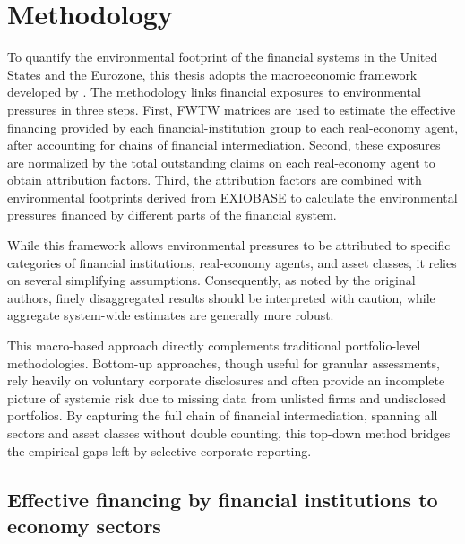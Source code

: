 
\chapter{Methodology} %

\label{Chapter3} %

To quantify the environmental footprint of the financial systems in the United States and the Eurozone, this thesis adopts the macroeconomic framework developed by \textcite{jondeau_environmental_2026}. The methodology links financial exposures to environmental pressures in three steps. First, FWTW matrices are used to estimate the effective financing provided by each financial-institution group to each real-economy agent, after accounting for chains of financial intermediation. Second, these exposures are normalized by the total outstanding claims on each real-economy agent to obtain attribution factors. Third, the attribution factors are combined with environmental footprints derived from EXIOBASE to calculate the environmental pressures financed by different parts of the financial system.

While this framework allows environmental pressures to be attributed to specific categories of financial institutions, real-economy agents, and asset classes, it relies on several simplifying assumptions. Consequently, as noted by the original authors, finely disaggregated results should be interpreted with caution, while aggregate system-wide estimates are generally more robust.


This macro-based approach directly complements traditional portfolio-level methodologies. Bottom-up approaches, though useful for granular assessments, rely heavily on voluntary corporate disclosures and often provide an incomplete picture of systemic risk due to missing data from unlisted firms and undisclosed portfolios. By capturing the full chain of financial intermediation, spanning all sectors and asset classes without double counting, this top-down method bridges the empirical gaps left by selective corporate reporting.

\section{Effective financing by financial institutions to economy sectors}
\label{sec:effective_financing}

